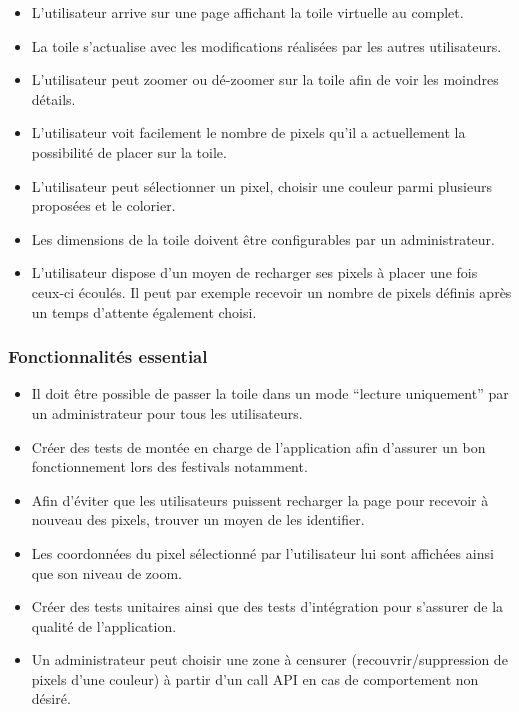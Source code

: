 \begin{itemize}
  \item L'utilisateur arrive sur une page affichant la toile virtuelle au complet.
  \item La toile s'actualise avec les modifications réalisées par les autres utilisateurs.
  \item L'utilisateur peut zoomer ou dé-zoomer sur la toile afin de voir les moindres détails.
  \item L'utilisateur voit facilement le nombre de pixels qu'il a actuellement la possibilité de placer sur la toile.
  \item L'utilisateur peut sélectionner un pixel, choisir une couleur parmi plusieurs proposées et le colorier.
  \item Les dimensions de la toile doivent être configurables par un administrateur.
  \item L'utilisateur dispose d'un moyen de recharger ses pixels à placer une fois ceux-ci écoulés. Il peut par exemple recevoir un nombre de pixels définis après un temps d'attente également choisi.
\end{itemize}

\subsubsection{Fonctionnalités \guillemotleft essential\guillemotright}

\begin{itemize}
  \item Il doit être possible de passer la toile dans un mode “lecture uniquement” par un administrateur pour tous les utilisateurs.
  \item Créer des tests de montée en charge de l'application afin d'assurer un bon fonctionnement lors des festivals notamment.
  \item Afin d'éviter que les utilisateurs puissent recharger la page pour recevoir à nouveau des pixels, trouver un moyen de les identifier.
  \item Les coordonnées du pixel sélectionné par l'utilisateur lui sont affichées ainsi que son niveau de zoom.
  \item Créer des tests unitaires ainsi que des tests d'intégration pour s'assurer de la qualité de l'application.
  \item Un administrateur peut choisir une zone à censurer (recouvrir/suppression de pixels d'une couleur) à partir d'un call API en cas de comportement non désiré.
\end{itemize}

